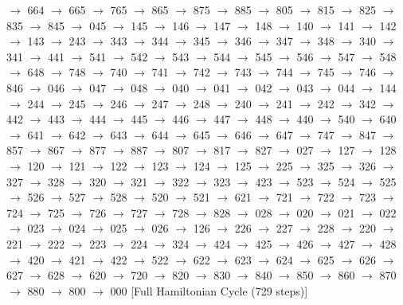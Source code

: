 $\rightarrow$ 664 $\rightarrow$ 665 $\rightarrow$ 765 $\rightarrow$ 865 $\rightarrow$ 875 $\rightarrow$ 885 $\rightarrow$ 805 $\rightarrow$ 815 $\rightarrow$ 825 $\rightarrow$ 835 $\rightarrow$ 845 $\rightarrow$ 045 $\rightarrow$ 145 $\rightarrow$ 146 $\rightarrow$ 147 $\rightarrow$ 148 $\rightarrow$ 140 $\rightarrow$ 141 $\rightarrow$ 142 $\rightarrow$ 143 $\rightarrow$ 243 $\rightarrow$ 343 $\rightarrow$ 344 $\rightarrow$ 345 $\rightarrow$ 346 $\rightarrow$ 347 $\rightarrow$ 348 $\rightarrow$ 340 $\rightarrow$ 341 $\rightarrow$ 441 $\rightarrow$ 541 $\rightarrow$ 542 $\rightarrow$ 543 $\rightarrow$ 544 $\rightarrow$ 545 $\rightarrow$ 546 $\rightarrow$ 547 $\rightarrow$ 548 $\rightarrow$ 648 $\rightarrow$ 748 $\rightarrow$ 740 $\rightarrow$ 741 $\rightarrow$ 742 $\rightarrow$ 743 $\rightarrow$ 744 $\rightarrow$ 745 $\rightarrow$ 746 $\rightarrow$ 846 $\rightarrow$ 046 $\rightarrow$ 047 $\rightarrow$ 048 $\rightarrow$ 040 $\rightarrow$ 041 $\rightarrow$ 042 $\rightarrow$ 043 $\rightarrow$ 044 $\rightarrow$ 144 $\rightarrow$ 244 $\rightarrow$ 245 $\rightarrow$ 246 $\rightarrow$ 247 $\rightarrow$ 248 $\rightarrow$ 240 $\rightarrow$ 241 $\rightarrow$ 242 $\rightarrow$ 342 $\rightarrow$ 442 $\rightarrow$ 443 $\rightarrow$ 444 $\rightarrow$ 445 $\rightarrow$ 446 $\rightarrow$ 447 $\rightarrow$ 448 $\rightarrow$ 440 $\rightarrow$ 540 $\rightarrow$ 640 $\rightarrow$ 641 $\rightarrow$ 642 $\rightarrow$ 643 $\rightarrow$ 644 $\rightarrow$ 645 $\rightarrow$ 646 $\rightarrow$ 647 $\rightarrow$ 747 $\rightarrow$ 847 $\rightarrow$ 857 $\rightarrow$ 867 $\rightarrow$ 877 $\rightarrow$ 887 $\rightarrow$ 807 $\rightarrow$ 817 $\rightarrow$ 827 $\rightarrow$ 027 $\rightarrow$ 127 $\rightarrow$ 128 $\rightarrow$ 120 $\rightarrow$ 121 $\rightarrow$ 122 $\rightarrow$ 123 $\rightarrow$ 124 $\rightarrow$ 125 $\rightarrow$ 225 $\rightarrow$ 325 $\rightarrow$ 326 $\rightarrow$ 327 $\rightarrow$ 328 $\rightarrow$ 320 $\rightarrow$ 321 $\rightarrow$ 322 $\rightarrow$ 323 $\rightarrow$ 423 $\rightarrow$ 523 $\rightarrow$ 524 $\rightarrow$ 525 $\rightarrow$ 526 $\rightarrow$ 527 $\rightarrow$ 528 $\rightarrow$ 520 $\rightarrow$ 521 $\rightarrow$ 621 $\rightarrow$ 721 $\rightarrow$ 722 $\rightarrow$ 723 $\rightarrow$ 724 $\rightarrow$ 725 $\rightarrow$ 726 $\rightarrow$ 727 $\rightarrow$ 728 $\rightarrow$ 828 $\rightarrow$ 028 $\rightarrow$ 020 $\rightarrow$ 021 $\rightarrow$ 022 $\rightarrow$ 023 $\rightarrow$ 024 $\rightarrow$ 025 $\rightarrow$ 026 $\rightarrow$ 126 $\rightarrow$ 226 $\rightarrow$ 227 $\rightarrow$ 228 $\rightarrow$ 220 $\rightarrow$ 221 $\rightarrow$ 222 $\rightarrow$ 223 $\rightarrow$ 224 $\rightarrow$ 324 $\rightarrow$ 424 $\rightarrow$ 425 $\rightarrow$ 426 $\rightarrow$ 427 $\rightarrow$ 428 $\rightarrow$ 420 $\rightarrow$ 421 $\rightarrow$ 422 $\rightarrow$ 522 $\rightarrow$ 622 $\rightarrow$ 623 $\rightarrow$ 624 $\rightarrow$ 625 $\rightarrow$ 626 $\rightarrow$ 627 $\rightarrow$ 628 $\rightarrow$ 620 $\rightarrow$ 720 $\rightarrow$ 820 $\rightarrow$ 830 $\rightarrow$ 840 $\rightarrow$ 850 $\rightarrow$ 860 $\rightarrow$ 870 $\rightarrow$ 880 $\rightarrow$ 800 $\rightarrow$ 000 
[Full Hamiltonian Cycle (729 steps)]


